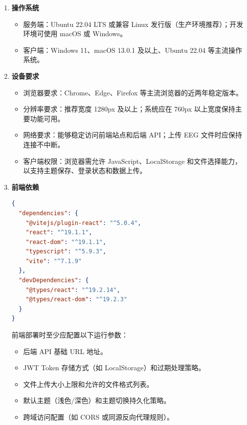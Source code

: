 \begin{enumerate}[(1)]
  \item \textbf{操作系统}
    \begin{itemize}
      \item 服务端：Ubuntu 22.04 LTS 或兼容 Linux 发行版（生产环境推荐）；开发环境可使用 macOS 或 Windows。
      \item 客户端：Windows 11、macOS 13.0.1 及以上、Ubuntu 22.04 等主流操作系统。
    \end{itemize}

  \item \textbf{设备要求}
    \begin{itemize}
      \item 浏览器要求：Chrome、Edge、Firefox 等主流浏览器的近两年稳定版本。
      \item 分辨率要求：推荐宽度 1280px 及以上；系统应在 760px 以上宽度保持主要功能可用。
      \item 网络要求：能够稳定访问前端站点和后端 API；上传 EEG 文件时应保持连接不中断。
      \item 客户端权限：浏览器需允许 JavaScript、LocalStorage 和文件选择能力，以支持主题保存、登录状态和数据上传。
    \end{itemize}

  \item \textbf{前端依赖}
    \begin{lstlisting}[language=json]
{
  "dependencies": {
    "@vitejs/plugin-react": "^5.0.4",
    "react": "^19.1.1",
    "react-dom": "^19.1.1",
    "typescript": "^5.9.3",
    "vite": "^7.1.9"
  },
  "devDependencies": {
    "@types/react": "^19.2.14",
    "@types/react-dom": "^19.2.3"
  }
}
    \end{lstlisting}
    前端部署时至少应配置以下运行参数：
    \begin{itemize}
      \item 后端 API 基础 URL 地址。
      \item JWT Token 存储方式（如 LocalStorage）和过期处理策略。
      \item 文件上传大小上限和允许的文件格式列表。
      \item 默认主题（浅色/深色）和主题切换持久化策略。
      \item 跨域访问配置（如 CORS 或同源反向代理规则）。
    \end{itemize}


\end{enumerate}
